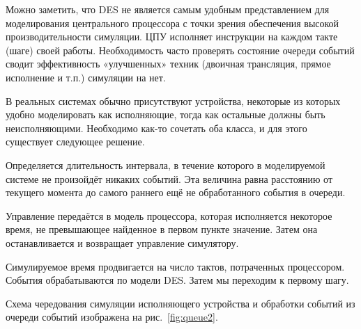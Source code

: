 Можно заметить, что DES не является самым удобным представлением для моделирования центрального процессора с точки зрения обеспечения высокой производительности симуляции. ЦПУ исполняет инструкции на каждом такте (шаге) своей работы. Необходимость часто проверять состояние очереди событий сводит эффективность «улучшенных» техник (двоичная трансляция, прямое исполнение и т.п.) симуляции на нет. 

В реальных системах обычно присутствуют устройства, некоторые из которых удобно моделировать как исполняющие, тогда как остальные должны быть неисполняющими. Необходимо как-то сочетать оба класса, и для этого существует следующее решение.

\begin{enumerate*}
\item Определяется длительность интервала, в течение которого в моделируемой системе не произойдёт никаких событий. Эта величина равна расстоянию от текущего момента до самого раннего ещё не обработанного события в очереди.

\item Управление передаётся в модель процессора, которая исполняется  некоторое время, не превышающее найденное в первом пункте значение. Затем она останавливается и возвращает управление симулятору.

\item Симулируемое время продвигается на число тактов, потраченных процессором. События обрабатываются по модели DES. Затем мы переходим к первому шагу.
\end{enumerate*}

Схема чередования симуляции исполняющего устройства и обработки событий из очереди событий изображена на рис.~\ref{fig:queue2}.

